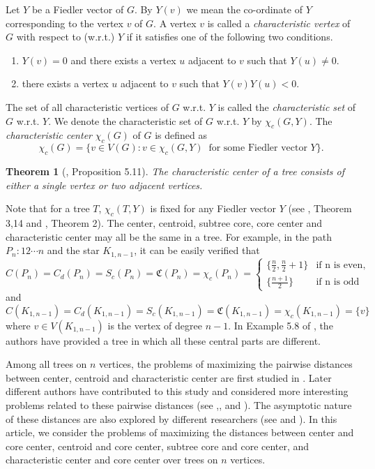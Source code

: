 \documentclass[10pt,a4paper]{amsart}
\newtheorem{theorem}{Theorem}[section]
\begin{document}
Let $Y$ be a Fiedler vector of $G$. By $Y(v)$ we mean the co-ordinate of $Y$ corresponding to the vertex $v$ of $G$. A vertex $v$ is called a {\it characteristic vertex}  of $G$ with respect to (w.r.t.) $Y$ if it satisfies one of the following two conditions.
 \begin{enumerate}
 \item[$(i)$] $Y(v)=0$ and there exists a vertex $u$ adjacent to $v$ such that $Y(u)\neq 0$.
 \item[$(ii)$] there exists a vertex $u$ adjacent to $v$ such that $Y(v)Y(u)<0$.
 \end{enumerate}
 \noindent The set of all characteristic vertices of $G$ w.r.t. $Y$ is called the {\it characteristic set} of $G$ w.r.t. $Y$. We denote the characteristic set of $G$ w.r.t.  $Y$ by $\chi_c(G,Y)$. The {\it characteristic center} $\chi_c(G)$ of $G$ is defined as
$$\chi_c(G)=\{v\in V(G): v \in \chi_c(G,Y) \;\;\mbox{for some Fiedler vector $Y$}\}.$$

\begin{theorem}[\cite{Pandey3}, Proposition 5.11]\label{p and p}
The characteristic center of a tree consists of either a single vertex or two adjacent vertices.
\end{theorem}
Note that for a tree $T$, $\chi_c(T,Y)$ is fixed for any Fiedler vector $Y$ (see \cite{Fie2}, Theorem 3,14 and \cite{Rm}, Theorem 2). The center, centroid, subtree core, core center and characteristic center may all be the same in a tree. For example, in the path $P_n:12\cdots n$ and the star $K_{1,n-1}$, it can be easily verified  that 
\begin{equation*}\label{CMS_path}
C(P_n)=C_d(P_n)=S_c(P_n)=\mathfrak{C}(P_n)=\chi_c(P_n)=
\begin{cases}
\{{\frac{n}{2}},{\frac{n}{2}+1}\}  &\mbox{if n is even},\\ 
\{{\frac{n+1}{2}}\}   & \mbox{if n is odd}
\end{cases}
\end{equation*}
and 
\begin{equation*}\label{CMS_star}
C(K_{1,n-1})=C_d(K_{1,n-1})=S_c(K_{1,n-1})=\mathfrak{C}(K_{1,n-1})=\chi_c(K_{1,n-1})=\{v\}
\end{equation*}
\noindent where $v\in V(K_{1,n-1})$ is the vertex of degree $n-1$. In Example 5.8 of \cite{Pandey3}, the authors have provided a tree in which all these central parts are different. 

Among all trees on $n$ vertices, the problems of maximizing the pairwise distances between center, centroid and characteristic center are first studied in  \cite{Klp}. Later different authors have contributed to this study and considered more interesting problems related to these pairwise distances (see \cite{Des},\cite{Pandey2},\cite{Pandey4} and \cite{Hs}). The asymptotic nature of these distances are also explored by different researchers (see \cite{Na} and \cite{Pandey2}). In this article, we consider the problems of maximizing the distances between center and core center, centroid and core center, subtree core and core center, and characteristic center and core center over trees on $n$ vertices. 
\end{document}
